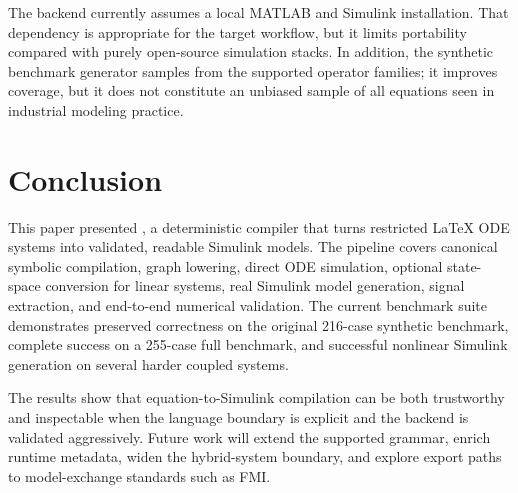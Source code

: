 \documentclass[colorlinks,upint,subscriptcorrection,varvw,balance,nofoot]{asmeconf}
\newcommand{\EqnToSim}{\NoCaseChange{Eqn2Sim}}
\begin{document}
The backend currently assumes a local MATLAB and Simulink installation. That dependency is appropriate for the target workflow, but it limits portability compared with purely open-source simulation stacks. In addition, the synthetic benchmark generator samples from the supported operator families; it improves coverage, but it does not constitute an unbiased sample of all equations seen in industrial modeling practice.

\section{Conclusion}
This paper presented \EqnToSim{}, a deterministic compiler that turns restricted \LaTeX{} ODE systems into validated, readable Simulink models. The pipeline covers canonical symbolic compilation, graph lowering, direct ODE simulation, optional state-space conversion for linear systems, real Simulink model generation, signal extraction, and end-to-end numerical validation. The current benchmark suite demonstrates preserved correctness on the original 216-case synthetic benchmark, complete success on a 255-case full benchmark, and successful nonlinear Simulink generation on several harder coupled systems.

The results show that equation-to-Simulink compilation can be both trustworthy and inspectable when the language boundary is explicit and the backend is validated aggressively. Future work will extend the supported grammar, enrich runtime metadata, widen the hybrid-system boundary, and explore export paths to model-exchange standards such as FMI.



\end{document}
